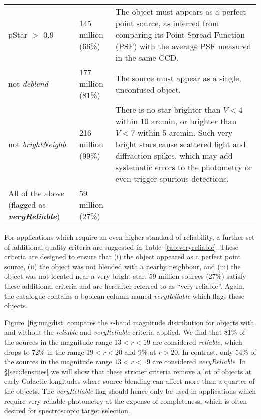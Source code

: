 \documentclass[useAMS,usenatbib]{mn2e}
\begin{document}
\begin{table*}
\begin{tabular}{p{8cm}lp{6cm}}
   pStar $>$ 0.9 &
   145 million (66\%) &
   The object must appears as a perfect point source,
   as inferred from comparing its Point Spread Function (PSF)
   with the average PSF measured in the same CCD. \\
   
   {\sc not} \emph{deblend} &
   177 million (81\%) &
   The source must appear as a single, unconfused object. \\
   
   {\sc not} \emph{brightNeighb} &
   216 million (99\%) &
   There is no star brighter than $V < 4$ within 10 arcmin, 
   or brighter than $V < 7$ within 5 arcmin.
   Such very bright stars cause scattered light and diffraction spikes,
   which may add systematic errors to the photometry
   or even trigger spurious detections. \\  
  \hline
  
  All of the above (flagged as {\bf\emph{veryReliable}}) &
  59 million (27\%) & \\
  \hline
\end{tabular}
\caption{Additional quality criteria which are recommended
for applications which require very reliable colours
at the expense of completeness. 
For convenience, the sources which satisfy the criteria listed
in this table have been flagged in the catalogue
using the column named \emph{veryReliable}.}
\label{tab:veryreliable}

\vspace{2cm}
\end{table*}

For applications which require
an even higher standard of reliability,
a further set of additional quality criteria
are suggested in Table~\ref{tab:veryreliable}.
These criteria are designed to ensure that
(i) the object appeared as a perfect point source,
(ii) the object was not blended with a nearby neighbour,
and (iii) the object was not located near a very bright star.
59 million sources (27\%) satisfy
these additional criteria 
and are hereafter referred to as ``very reliable''.
Again, the catalogue contains a boolean column
named \emph{veryReliable} which flags these objects.

Figure~\ref{fig:magdist} compares the $r$-band magnitude
distribution for objects with and without the 
\emph{reliable} and \emph{veryReliable} criteria applied. 
We find that 81\% of the sources 
in the magnitude range $13 < r < 19$
are considered \emph{reliable},
which drops to 72\% in the range $19 < r < 20$
and 9\% at $r>20$.
In contrast, only 54\% of the sources 
in the magnitude range $13 < r < 19$
are considered \emph{veryReliable}.
In \S\ref{sec:densities} we will show that these
stricter criteria remove a lot
of objects at early Galactic longitudes 
where source blending can affect more than a quarter of the objects.
The \emph{veryReliable} flag should hence
only be used in applications which require very reliable photometry
at the expense of completeness,
which is often desired for spectroscopic target selection.
\end{document}
